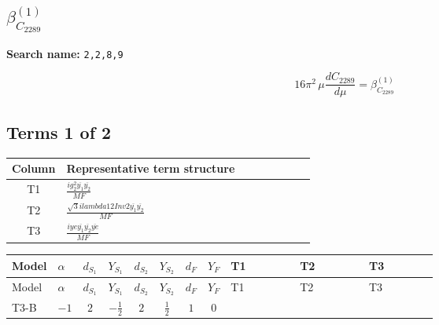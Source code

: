 \documentclass[8pt]{article}
\begin{document}
\begin{landscape}
\section*{$\beta_{C_{2289}}^{(1)}$}
\noindent\textbf{Search name: }\texttt{2,2,8,9}\par\smallskip
\[16\pi^2\,\mu\frac{d C_{2289}}{d\mu}=\beta_{C_{2289}}^{(1)}\]
\subsection*{Terms 1 of 2}
\begin{center}
\begin{tabular}{@{}c >{\raggedright\arraybackslash}p{0.82\linewidth}@{}}
\toprule
Column & Representative term structure \\
\midrule
T1 & \(\displaystyle \frac{i g_{2}^{2} \overline{y_{1}} \overline{y_{2}}}{MF}\) \\
\midrule
T2 & \(\displaystyle \frac{\sqrt{3} i lambda12Inv2 \overline{y_{1}} \overline{y_{2}}}{MF}\) \\
\midrule
T3 & \(\displaystyle \frac{i ye \overline{y_{1}} \overline{y_{2}} \overline{ye}}{MF}\) \\
\midrule
\bottomrule
\end{tabular}
\end{center}
\smallskip
\tiny
\begin{longtable}{@{}llcccccc >{\raggedright\arraybackslash}p{0.21\linewidth} >{\raggedright\arraybackslash}p{0.21\linewidth} >{\raggedright\arraybackslash}p{0.21\linewidth}@{}}
\toprule
Model & $\alpha$ & $d_{S_1}$ & $Y_{S_1}$ & $d_{S_2}$ & $Y_{S_2}$ & $d_F$ & $Y_F$ & T1 & T2 & T3 \\
\midrule
\endfirsthead
\toprule
Model & $\alpha$ & $d_{S_1}$ & $Y_{S_1}$ & $d_{S_2}$ & $Y_{S_2}$ & $d_F$ & $Y_F$ & T1 & T2 & T3 \\
\midrule
\endhead
T3-B & $-1$ & $2$ & $-\frac{1}{2}$ & $2$ & $\frac{1}{2}$ & $1$ & $0$ & \scriptsize\adjustbox{max width=\linewidth}{$\begin{gathered} - \frac{3 i g_{2}^{2} \overline{y_{1}} \overline{y_{2}}}{4 MF}\end{gathered}$} & \scriptsize\adjustbox{max width=\linewidth}{$\begin{gathered} - \frac{\sqrt{3} i lambda12Inv2 \overline{y_{1}} \overline{y_{2}}}{3 MF}\end{gathered}$} & \scriptsize\adjustbox{max width=\linewidth}{$\begin{gathered} \frac{i ye \overline{y_{1}} \overline{y_{2}} \overline{ye}}{4 MF}\end{gathered}$} \\

\end{longtable}
\end{landscape}
\end{document}
